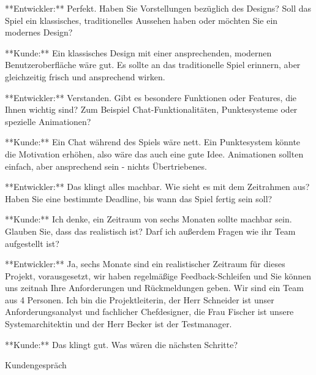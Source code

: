 \begin{prompt}[H]
\begin{tcolorbox}[colback=gray!20, colframe=gray!20, boxrule=0pt, sharp corners]
        **Entwickler:** Perfekt. Haben Sie Vorstellungen bezüglich des Designs? Soll das Spiel ein klassisches, traditionelles Aussehen haben oder möchten Sie ein modernes Design?
        
        **Kunde:** Ein klassisches Design mit einer ansprechenden, modernen Benutzeroberfläche wäre gut. Es sollte an das traditionelle Spiel erinnern, aber gleichzeitig frisch und ansprechend wirken.
        
        **Entwickler:** Verstanden. Gibt es besondere Funktionen oder Features, die Ihnen wichtig sind? Zum Beispiel Chat-Funktionalitäten, Punktesysteme oder spezielle Animationen?
        
        **Kunde:** Ein Chat während des Spiels wäre nett. Ein Punktesystem könnte die Motivation erhöhen, also wäre das auch eine gute Idee. Animationen sollten einfach, aber ansprechend sein - nichts Übertriebenes.
        
        **Entwickler:** Das klingt alles machbar. Wie sieht es mit dem Zeitrahmen aus? Haben Sie eine bestimmte Deadline, bis wann das Spiel fertig sein soll?
        
        **Kunde:** Ich denke, ein Zeitraum von sechs Monaten sollte machbar sein. Glauben Sie, dass das realistisch ist? Darf ich außerdem Fragen wie ihr Team aufgestellt ist?
        
        **Entwickler:** Ja, sechs Monate sind ein realistischer Zeitraum für dieses Projekt, vorausgesetzt, wir haben regelmäßige Feedback-Schleifen und Sie können uns zeitnah Ihre Anforderungen und Rückmeldungen geben. Wir sind ein Team aus 4 Personen. Ich bin die Projektleiterin, der Herr Schneider ist unser Anforderungsanalyst und fachlicher Chefdesigner, die Frau Fischer ist unsere Systemarchitektin und der Herr Becker ist der Testmanager.
        
        **Kunde:** Das klingt gut. Was wären die nächsten Schritte?
        \vfill
    \end{tcolorbox}
    \caption{Kundengespräch}
    \label{Kundengespräch1}
\end{prompt}


